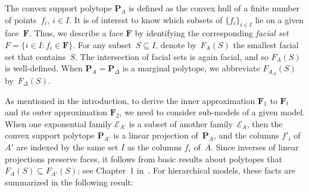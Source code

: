 \documentclass[aos,noinfoline]{imsart}
\newcommand{\face}{F}
\def\R{{\mathbf R}}
\newcommand{\Ecal}{\mathcal{E}}
\newcommand{\Fbf}{\mathbf{F}}
\newcommand{\Pbf}{\mathbf{P}}
\theoremstyle{remark}
\newtheorem{fact}{Fact} %
\theoremstyle{definition}
\begin{document}



The convex support polytope $\Pbf_{A}$ is defined as the convex hull of a finite number of points~$f_{i}$, $i\in I$.  It
is of interest to know which subsets of $\{f_{i}\}_{i\in I}$ lie on a given face~$\Fbf$.
Thus, we describe a face $\Fbf$ by identifying the corresponding \emph{facial set} $F = \{i\in I: f_{i}\in\Fbf\}$.  For
any subset~$S\subseteq I$, denote by~$\face_{A}(S)$ the smallest facial set that contains~$S$.  The intersection of
facial sets is again facial, and so $\face_{A}(S)$ is well-defined.  When $\Pbf_{A}=\Pbf_{\Delta}$ is a marginal
polytope, we abbreviate $\face_{A_\Delta}(S)$ by~$\face_\Delta(S)$.

As mentioned in the introduction, to derive the inner approximation $\Fbf_1$ to $\Fbf_t$ and its outer approximation
$\Fbf_2$, we need to consider sub-models of a given model.
When one exponential family $\Ecal_{A'}$ is a subset of another family~$\Ecal_{A}$, then the convex support polytope
$\Pbf_{A'}$ is a linear projection of~$\Pbf_{A}$, and the columns $f'_{i}$ of $A'$ are indexed by the same set $I$ as
the columns $f_{i}$ of~$A$.  Since inverses of linear projections preserve faces, it follows from basic results about
polytopes that $\face_{A}(S)\subseteq\face_{A'}(S)$; see Chapter~1 in~\citet{Ziegler98:Lectures_on_Polytopes}.  For
hierarchical models, these facts are summarized in the following result:
\end{document}
